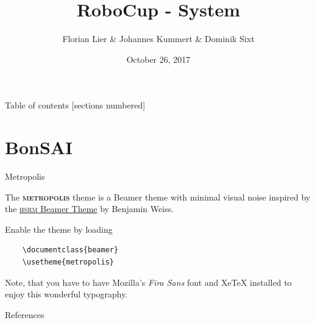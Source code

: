 \documentclass[10pt]{beamer}
\title{RoboCup - System}
\date{October 26, 2017}
\author{Florian Lier \& Johannes Kummert \& Dominik Sixt}
\newcommand{\themename}{\textbf{\textsc{metropolis}}\xspace}
\begin{document}
\maketitle

\begin{frame}{Table of contents}
  [sections numbered]
  \tableofcontents[hideallsubsections]
\end{frame}











\section{BonSAI} %


\begin{frame}[fragile]{Metropolis}

  The \themename theme is a Beamer theme with minimal visual noise
  inspired by the \href{https://github.com/hsrmbeamertheme/hsrmbeamertheme}{\textsc{hsrm} Beamer
  Theme} by Benjamin Weiss.

  Enable the theme by loading

  \begin{verbatim}    \documentclass{beamer}
    \usetheme{metropolis}\end{verbatim}

  Note, that you have to have Mozilla's \emph{Fira Sans} font and XeTeX
  installed to enjoy this wonderful typography.
\end{frame}


\begin{frame}[allowframebreaks]{References}

  
  

\end{frame}
\end{document}
